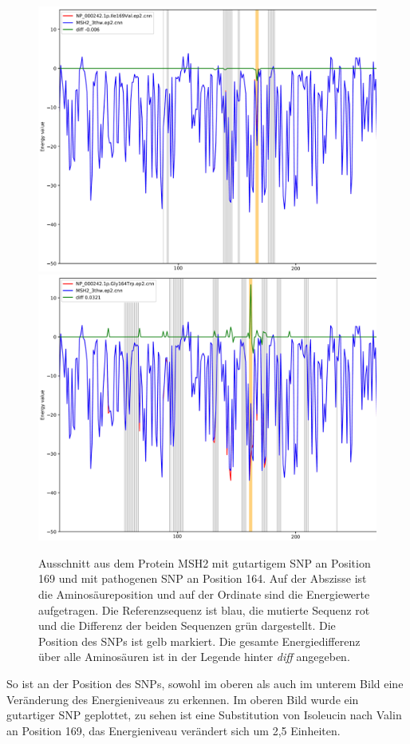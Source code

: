 \begin{figure}
    \centering
    \includegraphics[width=.90\textwidth]{images/comp_plot_Ile169Val.png}
    \includegraphics[width=.90\textwidth]{images/comp_plot_Gly164Trp.png}
    \caption{Ausschnitt aus dem Protein MSH2 mit gutartigem \ac{SNP} an Position 169 und mit pathogenen \ac{SNP} an Position 164. Auf der Abszisse ist die Aminosäureposition und auf der Ordinate sind die Energiewerte aufgetragen. Die Referenzsequenz ist blau, die mutierte Sequenz rot und die Differenz der beiden Sequenzen grün dargestellt. Die Position des \ac{SNP}s ist gelb markiert. Die gesamte Energiedifferenz über alle Aminosäuren ist in der Legende hinter \emph{diff} angegeben.} 
    \label{fig:comp_plot_MSH2}
\end{figure}

So ist an der Position des \ac{SNP}s, sowohl im oberen als auch im unterem Bild eine Veränderung des Energieniveaus zu erkennen. Im oberen Bild wurde ein gutartiger \ac{SNP} geplottet, zu sehen ist eine Substitution von Isoleucin nach Valin an Position 169, das Energieniveau verändert sich um 2,5 Einheiten. 


